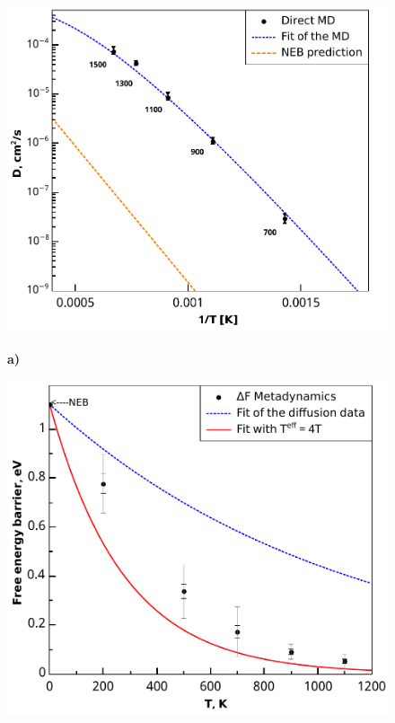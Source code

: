 \documentclass[master,14pt,subf,href,colorlinks=true
]{disser}
\begin{document}
\begin{figure}%
	\begin{center}
		\begin{minipage}{.7\linewidth}
			\begin{center}
				\includegraphics[width=1\linewidth]{D_1_T.pdf}

\textbf{a)}
			\end{center}
		\end{minipage} \hspace{1pc}
		\begin{minipage}{.7\linewidth}
			\begin{center}
				\includegraphics[width=1\linewidth]{W_T_metadynamics.pdf}


\end{center}
\end{minipage}
\end{center}
\end{figure}
\end{document}
